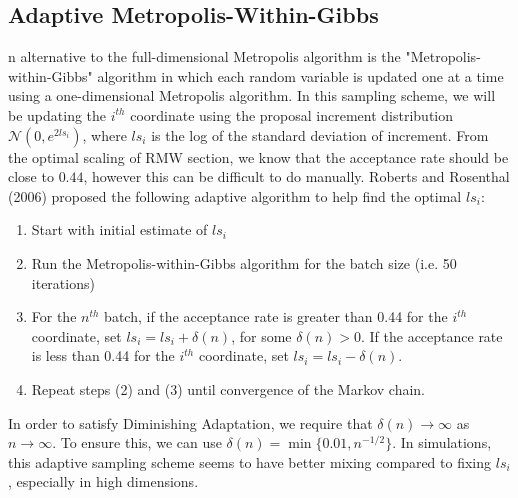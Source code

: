 \documentclass[twoside]{article}
\begin{document}
\subsection{Adaptive Metropolis-Within-Gibbs}
n alternative to the full-dimensional Metropolis algorithm is the "Metropolis-within-Gibbs" algorithm in which each random variable is updated one at a time using a one-dimensional Metropolis algorithm. In this sampling scheme, we will be updating the $i^{th}$ coordinate using the proposal increment distribution $\mathcal{N}(0, e^{2ls_i})$, where $ls_i$ is the log of the standard deviation of increment. From the optimal scaling of RMW section, we know that the acceptance rate should be close to $0.44$, however this can be difficult to do manually. Roberts and Rosenthal (2006) proposed the following adaptive algorithm to help find the optimal $ls_i$:
\begin{enumerate}
	\item Start with initial estimate of $ls_i$
	\item Run the Metropolis-within-Gibbs algorithm for the batch size (i.e. 50 iterations)
	\item For the $n^{th}$ batch, if the acceptance rate is greater than 0.44 for the $i^{th}$ coordinate, set $ls_i = ls_i + \delta(n)$, for some $\delta(n) > 0$. If the acceptance rate is less than 0.44 for the $i^{th}$ coordinate, set $ls_i = ls_i - \delta(n)$.
	\item Repeat steps (2) and (3) until convergence of the Markov chain.
\end{enumerate}
In order to satisfy Diminishing Adaptation, we require that $\delta(n) \rightarrow \infty$ as $n \rightarrow \infty$. To ensure this, we can use $\delta(n) = \min \{0.01, n^{-1/2}\}$. In simulations, this adaptive sampling scheme seems to have better mixing compared to fixing $ls_i$, especially in high dimensions.




\end{document}
